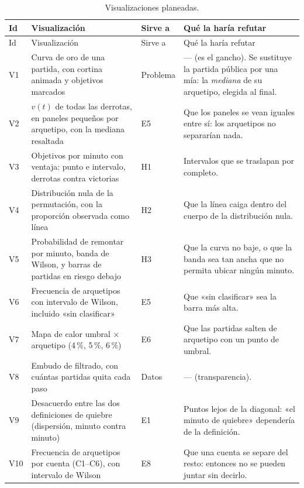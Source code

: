 \documentclass[11pt,letterpaper]{article}
\begin{document}
\begin{longtable}{p{0.8cm}p{4.0cm}p{2.0cm}p{7.8cm}}
\caption{Visualizaciones planeadas.}\\
\toprule
Id & Visualización & Sirve a & Qué la haría refutar \\
\midrule
\endfirsthead
\toprule
Id & Visualización & Sirve a & Qué la haría refutar \\
\midrule
\endhead
V1 & Curva de oro de una partida, con cortina animada y objetivos marcados & Problema & — (es el gancho). Se sustituye la partida pública por una mía: la \emph{mediana} de su arquetipo, elegida al final. \\
\addlinespace
V2 & \(v(t)\) de todas las derrotas, en paneles pequeños por arquetipo, con la mediana resaltada & E5 & Que los paneles se vean iguales entre sí: los arquetipos no separarían nada. \\
\addlinespace
V3 & Objetivos por minuto con ventaja: punto e intervalo, derrotas contra victorias & H1 & Intervalos que se traslapan por completo. \\
\addlinespace
V4 & Distribución nula de la permutación, con la proporción observada como línea & H2 & Que la línea caiga dentro del cuerpo de la distribución nula. \\
\addlinespace
V5 & Probabilidad de remontar por minuto, banda de Wilson, y barras de partidas en riesgo debajo & H3 & Que la curva no baje, o que la banda sea tan ancha que no permita ubicar ningún minuto. \\
\addlinespace
V6 & Frecuencia de arquetipos con intervalo de Wilson, incluido «sin clasificar» & E5 & Que «sin clasificar» sea la barra más alta. \\
\addlinespace
V7 & Mapa de calor umbral × arquetipo (4\,\%, 5\,\%, 6\,\%) & E6 & Que las partidas salten de arquetipo con un punto de umbral. \\
\addlinespace
V8 & Embudo de filtrado, con cuántas partidas quita cada paso & Datos & — (transparencia). \\
\addlinespace
V9 & Desacuerdo entre las dos definiciones de quiebre (dispersión, minuto contra minuto) & E1 & Puntos lejos de la diagonal: «el minuto de quiebre» dependería de la definición. \\
\addlinespace
V10 & Frecuencia de arquetipos por cuenta (C1--C6), con intervalo de Wilson & E8 & Que una cuenta se separe del resto: entonces no se pueden juntar sin decirlo. \\
\bottomrule
\end{longtable}
\end{document}
